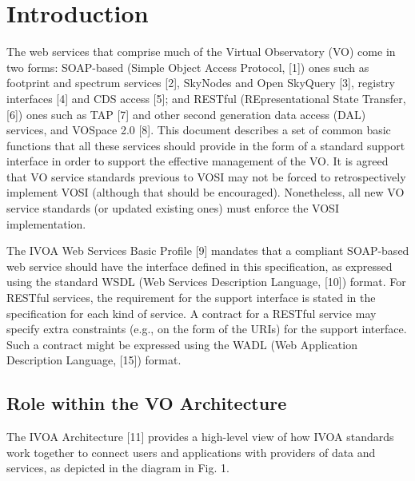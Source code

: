 \documentclass[11pt,letter]{ivoa}
\begin{document}
\section{Introduction}

The web services that comprise much of the Virtual Observatory (VO) come in two forms: SOAP-based (Simple Object Access Protocol, [1]) ones such as footprint and spectrum services [2], SkyNodes and Open SkyQuery [3], registry interfaces [4] and CDS access [5]; and RESTful (REpresentational State Transfer, [6]) ones such as TAP [7] and other second generation data access (DAL) services, and VOSpace 2.0 [8]. This document describes a set of common basic functions that all these services should provide in the form of a standard support interface in order to support the effective management of the VO. It is agreed that VO service standards previous to VOSI may not be forced to retrospectively implement VOSI (although that should be encouraged). Nonetheless, all new VO service standards (or updated existing ones) must enforce the VOSI implementation.

The IVOA Web Services Basic Profile [9] mandates that a compliant SOAP-based web service should have the interface defined in this specification, as expressed using the standard WSDL (Web Services Description Language, [10]) format. For RESTful services, the requirement for the support interface is stated in the specification for each kind of service. A contract for a RESTful service may specify extra constraints (e.g., on the form of the URIs) for the support interface. Such a contract might be expressed using the WADL (Web Application Description Language, [15]) format. 

\subsection{Role within the VO Architecture}

The IVOA Architecture [11] provides a high-level view of how IVOA standards work together to connect users and applications with providers of data and services, as depicted in the diagram in Fig. 1. 
\end{document}
